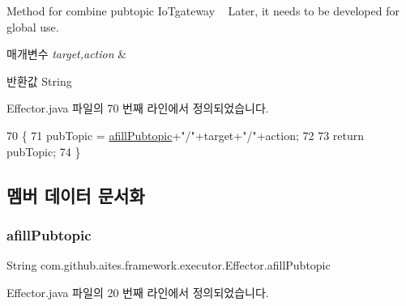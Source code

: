 Method for combine pubtopic Io\+Tgateway ~\newline
Later, it needs to be developed for global use. 


\begin{DoxyParams}{매개변수}
{\em target,action} & \\
\hline
\end{DoxyParams}
\begin{DoxyReturn}{반환값}
String 
\end{DoxyReturn}


Effector.\+java 파일의 70 번째 라인에서 정의되었습니다.


\begin{DoxyCode}
70                                                           \{
71         pubTopic = \mbox{\hyperlink{classcom_1_1github_1_1aites_1_1framework_1_1executor_1_1_effector_ada537f3c9fe303eb9503821843b08b30}{afillPubtopic}}+\textcolor{stringliteral}{"/"}+target+\textcolor{stringliteral}{"/"}+action;
72         
73         \textcolor{keywordflow}{return} pubTopic;
74     \}
\end{DoxyCode}


\subsection{멤버 데이터 문서화}
\mbox{\label{classcom_1_1github_1_1aites_1_1framework_1_1executor_1_1_effector_ada537f3c9fe303eb9503821843b08b30}} 
\subsubsection{\texorpdfstring{afill\+Pubtopic}{afillPubtopic}}
{\footnotesize\ttfamily String com.\+github.\+aites.\+framework.\+executor.\+Effector.\+afill\+Pubtopic\hspace{0.3cm}{\ttfamily [private]}}



Effector.\+java 파일의 20 번째 라인에서 정의되었습니다.

\mbox{\label{classcom_1_1github_1_1aites_1_1framework_1_1executor_1_1_effector_a8df1631ecb6613a1e323f131369cd0b0}} 
